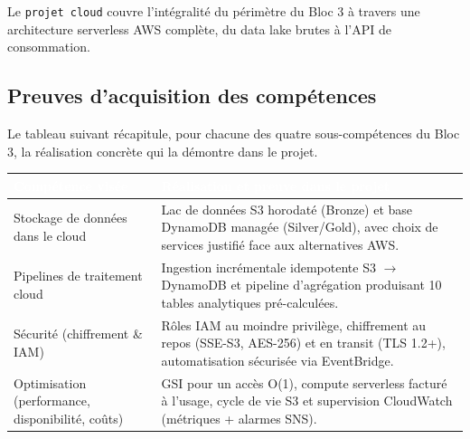 \documentclass[11pt]{article}
\newcommand{\thead}[1]{\textbf{\textcolor{white}{#1}}}
\begin{document}
Le \texttt{projet cloud} couvre l'intégralité du périmètre du Bloc 3 à travers une
architecture serverless AWS complète, du data lake brutes à l'API de
consommation.

\subsection{Preuves d'acquisition des compétences}
\label{sec:preuves}

Le tableau suivant récapitule, pour chacune des quatre sous-compétences du Bloc 3, la
réalisation concrète qui la démontre dans le projet.

\begin{center}
\begin{tabularx}{\linewidth}{|>{\raggedright\arraybackslash}p{4.4cm}|>{\raggedright\arraybackslash}X|}
\hline
\rowcolor{tableHeader}
\thead{Compétence visée} & \thead{Réalisation et preuve dans le projet} \\
\hline
Stockage de données dans le cloud &
  Lac de données S3 horodaté (Bronze) et base DynamoDB managée (Silver/Gold),
  avec choix de services justifié face aux alternatives AWS. \\
\hline
Pipelines de traitement cloud &
  Ingestion incrémentale idempotente S3 $\rightarrow$ DynamoDB et pipeline
  d'agrégation produisant 10 tables analytiques pré-calculées. \\
\hline
Sécurité (chiffrement \& IAM) &
  Rôles IAM au moindre privilège, chiffrement au repos (SSE-S3, AES-256) et en
  transit (TLS 1.2+), automatisation sécurisée via EventBridge. \\
\hline
Optimisation (performance, disponibilité, coûts) &
  GSI pour un accès O(1), compute serverless facturé à l'usage, cycle de vie S3 et
  supervision CloudWatch (métriques + alarmes SNS). \\
\hline
\end{tabularx}
\end{center}
\end{document}
